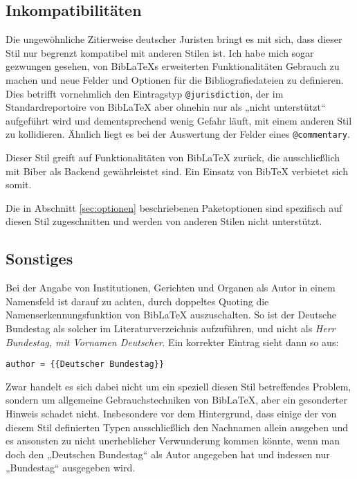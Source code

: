 \documentclass[11pt,a4paper,DIV=calc]{scrartcl}
\newcommand\software[1]{\textsf{#1}}
\newcommand\Biblatex{\software{Bib\LaTeX{}}\xspace}
\begin{document}
\subsection{Inkompatibilitäten}\label{sec:inkompat}

Die ungewöhnliche Zitierweise deutscher Juristen bringt es mit sich,
dass dieser Stil nur begrenzt kompatibel mit anderen Stilen ist. Ich
habe mich sogar gezwungen gesehen, von \Biblatex{}s erweiterten
Funktionalitäten Gebrauch zu machen und neue Felder und Optionen für
die Bibliografiedateien zu definieren. Dies betrifft vornehmlich den
Eintragstyp \verb+@jurisdiction+, der im Standardreportoire von
\Biblatex aber ohnehin nur als „nicht unterstützt“ aufgeführt wird und
dementsprechend wenig Gefahr läuft, mit einem anderen Stil zu
kollidieren. Ähnlich liegt es bei der Auswertung der Felder eines
\verb+@commentary+.

Dieser Stil greift auf Funktionalitäten von \Biblatex zurück, die
ausschließlich mit \software{Biber} als Backend gewährleistet
sind. Ein Einsatz von \software{Bib\TeX{}} verbietet sich somit.

Die in Abschnitt \ref{sec:optionen} beschriebenen Paketoptionen sind
spezifisch auf diesen Stil zugeschnitten und werden von anderen Stilen
nicht unterstützt.

\subsection{Sonstiges}

Bei der Angabe von Institutionen, Gerichten und Organen als Autor in
einem Namensfeld ist darauf zu achten, durch doppeltes Quoting die
Namenserkennungsfunktion von \Biblatex auszuschalten. So ist der
Deutsche Bundestag als solcher im Literaturverzeichnis aufzuführen,
und nicht als \emph{Herr Bundestag, mit Vornamen Deutscher}. Ein
korrekter Eintrag sieht dann so aus:

\begin{verbatim}
author = {{Deutscher Bundestag}}
\end{verbatim}

Zwar handelt es sich dabei nicht um ein speziell diesen Stil
betreffendes Problem, sondern um allgemeine Gebrauchstechniken von
\Biblatex, aber ein gesonderter Hinweis schadet nicht. Insbesondere
vor dem Hintergrund, dass einige der von diesem Stil definierten Typen
ausschließlich den Nachnamen allein ausgeben und es ansonsten zu nicht
unerheblicher Verwunderung kommen könnte, wenn man doch den „Deutschen
Bundestag“ als Autor angegeben hat und indessen nur „Bundestag“ ausgegeben
wird.
\end{document}
